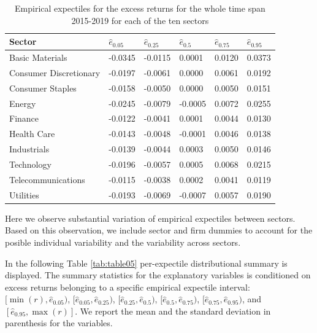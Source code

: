\documentclass[]{article}
\begin{document}
\begin{table}[h!]

\caption{\label{tab:table04}Empirical expectiles for the excess returns for the whole time span 2015-2019 for each of the ten sectors}
\centering
\begin{tabular}[t]{l|l|l|l|l|l}
\hline
 Sector & $\hat e_{0.05}$ & $\hat e_{0.25}$ & $\hat e_{0.5}$ & $\hat e_{0.75}$ & $\hat e_{0.95}$\\
\hline
Basic Materials & -0.0345 & -0.0115 & 0.0001 & 0.0120 & 0.0373\\
\hline
Consumer Discretionary & -0.0197 & -0.0061 & 0.0000 & 0.0061 & 0.0192\\
\hline
Consumer Staples & -0.0158 & -0.0050 & 0.0000 & 0.0050 & 0.0151\\
\hline
Energy & -0.0245 & -0.0079 & -0.0005 & 0.0072 & 0.0255\\
\hline
Finance & -0.0122 & -0.0041 & 0.0001 & 0.0044 & 0.0130\\
\hline
Health Care & -0.0143 & -0.0048 & -0.0001 & 0.0046 & 0.0138\\
\hline
Industrials & -0.0139 & -0.0044 & 0.0003 & 0.0050 & 0.0146\\
\hline
Technology & -0.0196 & -0.0057 & 0.0005 & 0.0068 & 0.0215\\
\hline
Telecommunications & -0.0115 & -0.0038 & 0.0002 & 0.0041 & 0.0119\\
\hline
Utilities & -0.0193 & -0.0069 & -0.0007 & 0.0057 & 0.0190\\
\hline
\end{tabular}
\end{table}

Here we observe substantial variation of empirical expectiles between sectors. Based on this observation, we include sector and firm dummies to account for the posible individual variability and the variability across sectors.

In the following Table \ref{tab:table05} per-expectile distributional summary is displayed. The summary statistics for the explanatory variables is conditioned on excess returns belonging to a specific empirical expectile interval: \([\min(r), \hat e_{0.05})\), \([\hat e_{0.05}, \hat e_{0.25} )\), \([\hat e_{0.25}, \hat e_{0.5})\), \([\hat e_{0.5}, \hat e_{0.75})\), \([\hat e_{0.75}, \hat e_{0.95})\), and \([\hat e_{0.95}, \max(r)]\). We report the mean and the standard deviation in parenthesis for the variables.
\end{document}

